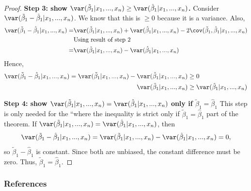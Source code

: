 \begin{proof}
  \textbf{Step 3:  show $\var(\tilde{\beta}_1 | x_1, ..., x_n) \geq
    \var(\hat{\beta}_1 | x_1, ..., x_n)$.} Consider
  $\var(\tilde{\beta}_1 - \hat{\beta}_1|x_1, ..., x_n)$. We know that this is $\geq
  0$ because it is a variance. Also, 
  \begin{align*}
    \var(\tilde{\beta}_1 - \hat{\beta}_1|x_1, ..., x_n) = &
    \var(\tilde{\beta}_1 | x_1, ..., x_n) +     \var(\hat{\beta}_1 |
    x_1, ..., x_n) - 2\cov(\tilde{\beta}_1,\hat{\beta}_1 | x_1, ...,
    x_n) \\
    & \text{Using result of step 2} \\
    = & \var(\tilde{\beta}_1 | x_1, ..., x_n) -\var(\hat{\beta}_1
        |x_1, ..., x_n) 
  \end{align*}
  Hence, 
  \begin{align*}
    \var(\tilde{\beta}_1 - \hat{\beta}_1|x_1, ..., x_n) =
    \var(\tilde{\beta}_1 | x_1, ..., x_n) -\var(\hat{\beta}_1   |x_1,
    ..., x_n)   & \geq 0 \\
    \var(\tilde{\beta}_1 | x_1, ..., x_n) & \geq \var(\hat{\beta}_1 |
                                            x_1, ..., x_n)
  \end{align*}
  
  \textbf{Step 4: show
    $\var(\tilde{\beta}_1 | x_1, ..., x_n) = \var(\hat{\beta}_1 | x_1,
    ..., x_n)$
    only if $\tilde{\beta}_1 = \hat{\beta}_1$} This step is only
  needed for the ``where the inequality is strict only if
  $\tilde{\beta}_1 = \hat{\beta}_1$ part of the theorem. If
  $\var(\tilde{\beta}_1 | x_1, ..., x_n) = \var(\hat{\beta}_1 | x_1,
  ..., x_n)$, then
  \[ \var(\tilde{\beta}_1 - \hat{\beta}_1|x_1, ..., x_n) =
  \var(\tilde{\beta}_1 | x_1, ..., x_n) -\var(\hat{\beta}_1   |x_1,
  ..., x_n)   = 0, \]
  so $\tilde{\beta}_1 - \hat{\beta}_1$ is constant. Since both are
  unbiased, the constant difference must be zero. Thus,
  $\tilde{\beta}_1 = \hat{\beta}_1$. 
\end{proof}




\begin{frame}[allowframebreaks]
  \frametitle{References}


\end{frame}
  

